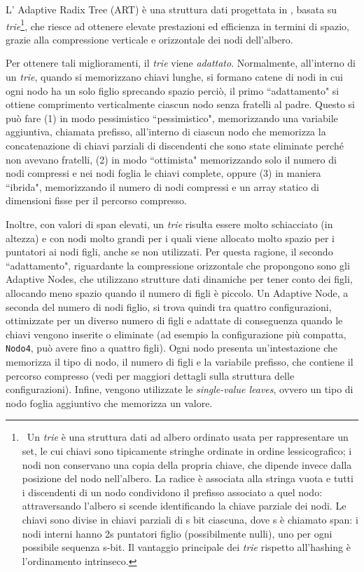 \documentclass[../main.tex]{subfiles}
\begin{document}
L' Adaptive Radix Tree (ART) è una struttura dati progettata in \cite{leis2013art}, basata su \textit{trie}\footnote{\ Un \textit{trie} è una struttura dati ad albero ordinato usata per rappresentare un set, le cui chiavi sono tipicamente stringhe ordinate in ordine lessicografico; i nodi non conservano una copia della propria chiave, che dipende invece dalla posizione del nodo nell'albero. La radice è associata alla stringa vuota e tutti i discendenti di un nodo condividono il prefisso associato a quel nodo: attraversando l'albero si scende identificando la chiave parziale dei nodi. Le chiavi sono divise in chiavi parziali di s bit ciascuna, dove s è chiamato span: i nodi interni hanno 2s puntatori figlio (possibilmente nulli), uno per ogni possibile sequenza s-bit. Il vantaggio principale dei \textit{trie} rispetto all'hashing è l'ordinamento intrinseco.}, che riesce ad ottenere elevate prestazioni ed efficienza in termini di spazio, grazie alla compressione verticale e orizzontale dei nodi dell'albero. 

Per ottenere tali miglioramenti, il \textit{trie} viene \textit{adattato}. Normalmente, all'interno di un \textit{trie}, quando si memorizzano chiavi lunghe, si formano catene di nodi in cui ogni nodo ha un solo figlio sprecando spazio perciò, il primo ``adattamento" si ottiene comprimento verticalmente ciascun nodo senza fratelli al padre. Questo si può fare (1) in modo pessimistico ``pessimistico", memorizzando una variabile aggiuntiva, chiamata prefisso, all'interno di ciascun nodo che memorizza la concatenazione di chiavi parziali di discendenti che sono state eliminate perché non avevano fratelli, (2) in modo ``ottimista" memorizzando solo il numero di nodi compressi e nei nodi foglia le chiavi complete, oppure (3) in maniera ``ibrida", memorizzando il numero di nodi compressi e un array statico di dimensioni fisse per il percorso compresso.

Inoltre, con valori di span elevati, un \textit{trie} risulta essere molto schiacciato (in altezza) e con nodi molto grandi per i quali viene allocato molto spazio per i puntatori ai nodi figli, anche se non utilizzati. Per questa ragione, il secondo ``adattamento", riguardante la compressione orizzontale che \cite{leis2013art} propongono sono gli Adaptive Nodes, che utilizzano strutture dati dinamiche per tener conto dei figli, allocando meno spazio quando il numero di figli è piccolo. Un Adaptive Node, a seconda del numero di nodi figlio, si trova quindi tra quattro configurazioni, ottimizzate per un diverso numero di figli e adattate di conseguenza quando le chiavi vengono inserite o eliminate (ad esempio la configurazione più compatta, \texttt{Nodo4}, può avere fino a quattro figli). Ogni nodo presenta un'intestazione che memorizza il tipo di nodo, il numero di figli e la variabile prefisso, che contiene il percorso compresso (vedi \cite{leis2013art} per maggiori dettagli sulla struttura delle configurazioni). Infine, vengono utilizzate le  \textit{single-value leaves}, ovvero un tipo di nodo foglia aggiuntivo che memorizza un valore.
\end{document}
